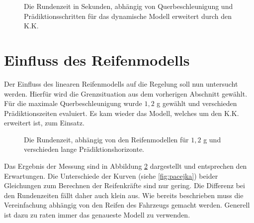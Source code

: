 \documentclass{like}
\begin{document}
\begin{figure}
	\centering
	 
	\caption{Die Rundenzeit in Sekunden, abhängig von Querbeschleunigung und Prädiktionsschritten für das dynamische Modell erweitert durch den \ac{K.K.}}
	\label{fig:betaMaxFineKam}
\end{figure}

\section{Einfluss des Reifenmodells}
Der Einfluss des linearen Reifenmodells auf die Regelung soll nun untersucht werden. Hierfür wird die Grenzsituation aus dem vorherigen Abschnitt gewählt. Für die maximale Querbeschleunigung wurde $1,2$ g gewählt und verschieden Prädiktionszeiten evaluiert. Es kam wieder das Modell, welches um den \ac{K.K.} erweitert ist, zum Einsatz.

\begin{figure}[ht!]
	\centering
	 
	\caption{Die Rundenzeit, abhängig von den Reifenmodellen für $1,2$ g und verschieden lange Prädiktionshorizonte.}
	\label{fig:tireModelDiff}
\end{figure}

Das Ergebnis der Messung sind in Abbildung \ref{fig:tireModelDiff} dargestellt und entsprechen den Erwartungen. Die Unterschiede der Kurven (siehe \ref{fig:pacejka}) beider Gleichungen zum Berechnen der Reifenkräfte sind nur gering. Die Differenz bei den Rundenzeiten fällt daher auch klein aus. Wie bereits beschrieben muss die Vereinfachung abhängig von den Reifen des Fahrzeugs gemacht werden. Generell ist dazu zu raten immer das genaueste Modell zu verwenden.
\end{document}
